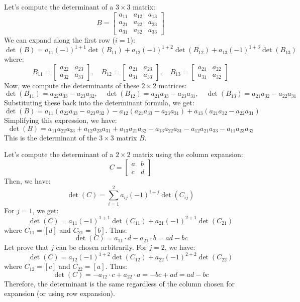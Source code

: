 \begin{eg}
    Let's compute the determinant of a \(3 \times 3\) matrix:
    \[
        B = \begin{bmatrix}
            a_{11} & a_{12} & a_{13} \\
            a_{21} & a_{22} & a_{23} \\
            a_{31} & a_{32} & a_{33}
        \end{bmatrix}
    \]
    We can expand along the first row (\(i = 1\)):
    \[
        \det(B) = a_{11} (-1)^{1+1} \det(B_{11}) + a_{12} (-1)^{1+2} \det(B_{12}) + a_{13} (-1)^{1+3} \det(B_{13})
    \]
    where:
    \[
        B_{11} = \begin{bmatrix}
            a_{22} & a_{23} \\
            a_{32} & a_{33}
        \end{bmatrix}, \quad
        B_{12} = \begin{bmatrix}
            a_{21} & a_{23} \\
            a_{31} & a_{33}
        \end{bmatrix}, \quad
        B_{13} = \begin{bmatrix}
            a_{21} & a_{22} \\
            a_{31} & a_{32}
        \end{bmatrix}
    \]
    Now, we compute the determinants of these \(2 \times 2\) matrices:
    \[
        \det(B_{11}) = a_{22}a_{33} - a_{23}a_{32}, \quad
        \det(B_{12}) = a_{21}a_{33} - a_{23}a_{31}, \quad
        \det(B_{13}) = a_{21}a_{32} - a_{22}a_{31}
    \]
    Substituting these back into the determinant formula, we get:
    \[
        \det(B) = a_{11}(a_{22}a_{33} - a_{23}a_{32}) - a_{12}(a_{21}a_{33} - a_{23}a_{31}) + a_{13}(a_{21}a_{32} - a_{22}a_{31})
    \]
    Simplifying this expression, we have:
    \[
        \det(B) = a_{11}a_{22}a_{33} + a_{12}a_{23}a_{31} + a_{13}a_{21}a_{32} - a_{13}a_{22}a_{31} - a_{12}a_{21}a_{33} - a_{11}a_{23}a_{32}
    \]
    This is the determinant of the \(3 \times 3\) matrix \(B\).
\end{eg}
\begin{eg}
    Let's compute the determinant of a $2 \times 2$ matrix using the column expansion:
    \[
        C = \begin{bmatrix}
            a & b \\
            c & d
        \end{bmatrix}
    \]
    Then, we have:
    \[
        \det(C) = \sum_{i = 1}^{2} a_{ij} (-1)^{i+j} \det(C_{ij})
    \]
    For \(j = 1\), we get:
    \[
        \det(C) = a_{11} (-1)^{1+1} \det(C_{11}) + a_{21} (-1)^{2+1} \det(C_{21})
    \]
    where \(C_{11} = [d]\) and \(C_{21} = [b]\). Thus:
    \[
        \det(C) = a_{11} \cdot d - a_{21} \cdot b = ad - bc
    \]
    Let prove that $j$ can be chosen arbitrarily. For \(j = 2\), we have:
    \[
        \det(C) = a_{12} (-1)^{1+2} \det(C_{12}) + a_{22} (-1)^{2+2} \det(C_{22})
    \]
    where \(C_{12} = [c]\) and \(C_{22} = [a]\). Thus:
    \[
        \det(C) = -a_{12} \cdot c + a_{22} \cdot a = -bc + ad = ad - bc
    \]
    Therefore, the determinant is the same regardless of the column chosen for expansion (or using row expansion).
\end{eg}

